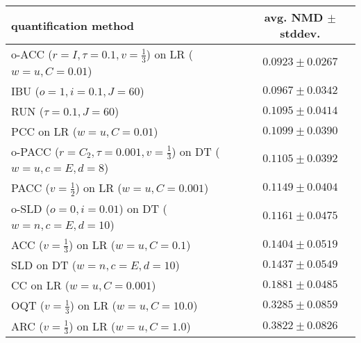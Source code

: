 \begin{tabular}{lc}
  \toprule
  quantification method & avg. NMD $\pm$ stddev. \\
  \midrule
  o-ACC ($r=I, \tau=0.1, v=\frac{1}{3}$) on LR ($w=u, C=0.01$) & $\mathbf{0.0923 \pm 0.0267}$ \\
  IBU ($o=1, i=0.1, J=60$) & $\mathbf{0.0967 \pm 0.0342}$ \\
  RUN ($\tau=0.1, J=60$) & $0.1095 \pm 0.0414$ \\
  PCC on LR ($w=u, C=0.01$) & $0.1099 \pm 0.0390$ \\
  o-PACC ($r=C_2, \tau=0.001, v=\frac{1}{3}$) on DT ($w=u, c=E, d=8$) & $0.1105 \pm 0.0392$ \\
  PACC ($v=\frac{1}{2}$) on LR ($w=u, C=0.001$) & $0.1149 \pm 0.0404$ \\
  o-SLD ($o=0, i=0.01$) on DT ($w=n, c=E, d=10$) & $0.1161 \pm 0.0475$ \\
  ACC ($v=\frac{1}{3}$) on LR ($w=u, C=0.1$) & $0.1404 \pm 0.0519$ \\
  SLD on DT ($w=n, c=E, d=10$) & $0.1437 \pm 0.0549$ \\
  CC on LR ($w=u, C=0.001$) & $0.1881 \pm 0.0485$ \\
  OQT ($v=\frac{1}{3}$) on LR ($w=u, C=10.0$) & $0.3285 \pm 0.0859$ \\
  ARC ($v=\frac{1}{3}$) on LR ($w=u, C=1.0$) & $0.3822 \pm 0.0826$ \\
  \bottomrule
\end{tabular}
